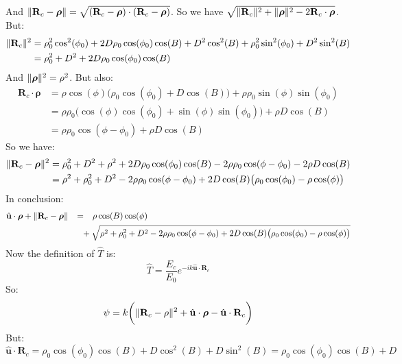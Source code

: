 \documentclass[oneside]{book}
\theoremstyle{mystyle}
\DeclarePairedDelimiter\norm{\lVert}{\rVert}
\begin{document}
And $\norm{\mathbf{R}_{c}-\boldsymbol{\rho}} = \sqrt{(\mathbf{R}_{c}-\boldsymbol{\rho})\cdot(\mathbf{R}_{c}-\boldsymbol{\rho})}$. So we have $\sqrt{\norm{\mathbf{R}_{c}}^2+\norm{\boldsymbol{\rho}}^2-2\mathbf{R}_{c}\cdot\boldsymbol{\rho}}$. But:
\begin{align*}
\nonumber \norm{\mathbf{R}_{c}}^2 &= \rho_{0}^2\cos^2(\phi_0)+2D\rho_{0}\cos(\phi_0)\cos(B)+D^2\cos^2(B) + \rho_{0}^2\sin^2(\phi_0)+D^2\sin^2(B) \\
&= \rho_{0}^2+D^2+2D\rho_{0}\cos(\phi_0)\cos(B)
\end{align*}
And $\norm{\boldsymbol{\rho}}^2 = \rho^2$. But also:
\begin{align*}
\nonumber \mathbf{R}_{c}\cdot \boldsymbol{\rho} &= \rho\cos(\phi)\big(\rho_{0}\cos(\phi_{0})+D\cos(B)\big)+\rho\rho_{0}\sin(\phi)\sin(\phi_{0})\\
\nonumber &= \rho\rho_{0}\big(\cos(\phi)\cos(\phi_{0})+\sin(\phi)\sin(\phi_{0})\big)+\rho D\cos(B)\\
&= \rho\rho_{0}\cos(\phi-\phi_{0})+\rho D\cos(B)
\end{align*}
So we have:
\begin{align*}
\nonumber \norm{\mathbf{R}_{c}-\boldsymbol{\rho}}^2 &= \rho_{0}^2+D^2+\rho^2+2D\rho_{0}\cos(\phi_{0})\cos(B)-2\rho\rho_{0}\cos(\phi-\phi_{0})-2\rho D\cos(B)\\
&=\rho^2+\rho_{0}^2+D^2-2\rho\rho_{0}\cos(\phi-\phi_{0}) + 2D\cos(B)\big(\rho_{0}\cos(\phi_0)-\rho\cos(\phi)\big)
\end{align*}
In conclusion:
\begin{align*}
    \hat{\mathbf{u}}\cdot \boldsymbol{\rho} + \norm{\mathbf{R}_{c}-\boldsymbol{\rho}} &\phantom{+}=\phantom{+}\rho\cos(B)\cos(\phi)\\
    &\phantom{+}\phantom{=}+\sqrt{\rho^2+\rho_{0}^2 + D^2 - 2\rho\rho_{0}\cos(\phi - \phi_{0}) + 2D\cos(B)\big(\rho_{0}\cos(\phi_0) - \rho\cos(\phi)\big)}
\end{align*}
Now the definition of $\hat{T}$ is:
\begin{equation*}
\hat{T} = \frac{E_{c}}{E_{0}}e^{-ik\hat{\mathbf{u}}\cdot\mathbf{R}_{c}}
\end{equation*}
So:
\begin{equation*}
\psi = k\bigg(\norm{\mathbf{R}_{c}-\rho}^2 + \hat{\mathbf{u}}\cdot\boldsymbol{\rho} - \hat{\mathbf{u}}\cdot \mathbf{R}_{c}\bigg)    
\end{equation*}
But:
\begin{equation*}
\hat{\mathbf{u}}\cdot \mathbf{R}_{c} = \rho_{0}\cos(\phi_0)\cos(B) + D\cos^2(B) + D\sin^2(B) = \rho_{0}\cos(\phi_0)\cos(B)+D    
\end{equation*}
\end{document}
